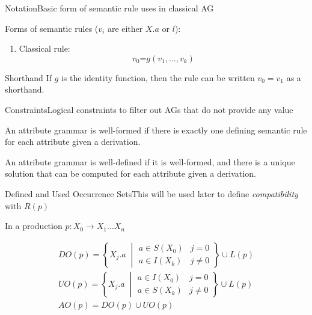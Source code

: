 \begin{frame}{Notation}{Basic form of semantic rule uses in classical AG}

Forms of semantic rules ($v_i$ are either $X.a$ or $l$):

\begin{enumerate}
    \item Classical rule: $$v_0 \texttt{=} g(v_1, \dots, v_k) $$
\end{enumerate}

\newlinevspace 
\newlinevspace 

\begin{block}{Shorthand}
If $g$ is the \alert{identity function}, then the rule can be written \alert{$v_0 = v_1$} as a shorthand.
\end{block}
    
\end{frame}



\begin{frame}{Constraints}{Logical constraints to filter out AGs that do not provide any value}

\begin{definition}
An attribute grammar is \alert{well-formed} if there is exactly one defining semantic rule for each attribute given a derivation.
\end{definition}

\begin{definition}
An attribute grammar is \alert{well-defined} if it is \alert{well-formed}, and there is a unique solution that can be computed for each attribute given a derivation.
\end{definition}
\end{frame}




\begin{frame}{Defined and Used Occurrence Sets}{This will be used later to define \emph{compatibility} with $R(p)$}

In a production $p: X_0 \rightarrow X_1 \dots X_n$

\begin{equation}
\begin{gathered}
  \mathit{DO}(p) = \left \{ X_j.a \; \middle\vert
    \begin{array}{cc}
     a \in S(X_0) & j = 0 \\
     a \in I(X_k) & j \neq 0
    \end{array}
\right \} \cup L(p) \\
\mathit{UO}(p) = \left \{ X_j.a \; \middle\vert
    \begin{array}{cc}
     a \in I(X_0) & j = 0 \\
     a \in S(X_k) & j \neq 0
    \end{array}
\right \} \cup L(p) \\
\mathit{AO}(p) = \mathit{DO}(p) \cup \mathit{UO}(p)
\end{gathered} 
\end{equation}

\end{frame}

